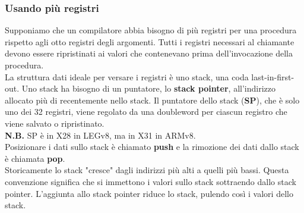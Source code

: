 \documentclass[12pt,a4paper]{article}
\begin{document}
\subsubsection{Usando più registri}
Supponiamo che un compilatore abbia bisogno di più registri per una procedura rispetto agli otto registri degli argomenti. Tutti i registri necessari al chiamante devono essere ripristinati ai valori che contenevano prima dell'invocazione della procedura.\\
La struttura dati ideale per versare i registri è uno stack, una coda last-in-first-out. Uno stack ha bisogno di un puntatore, lo \textbf{stack pointer}, all'indirizzo allocato più di recentemente nello stack. Il puntatore dello stack (\textbf{SP}), che è solo uno dei 32 registri, viene regolato da una doubleword per ciascun registro che viene salvato o ripristinato.\\
\textbf{N.B.} SP è in X28 in LEGv8, ma in X31 in ARMv8.\\
Posizionare i dati sullo stack è chiamato \textbf{push} e la rimozione dei dati dallo stack è chiamata \textbf{pop}.\\
Storicamente lo stack "cresce" dagli indirizzi più alti a quelli più bassi. Questa convenzione significa che si immettono i valori sullo stack sottraendo dallo stack pointer. L'aggiunta allo stack pointer riduce lo stack, pulendo così i valori dello stack.
\end{document}
